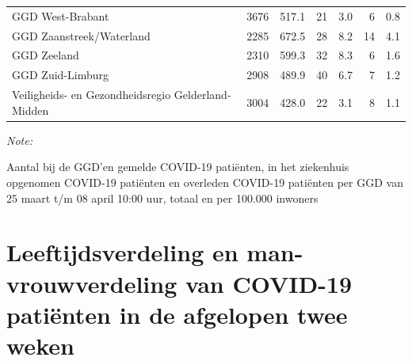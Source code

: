 \documentclass[
  english,
  man,floatsintext]{apa6}
\begin{document}
\begin{table}
\begin{threeparttable}
\begin{tabular}{lrrrrrr}
GGD West-Brabant & 3676 & 517.1 & 21 & 3.0 & 6 & 0.8\\
GGD Zaanstreek/Waterland & 2285 & 672.5 & 28 & 8.2 & 14 & 4.1\\
GGD Zeeland & 2310 & 599.3 & 32 & 8.3 & 6 & 1.6\\
GGD Zuid-Limburg & 2908 & 489.9 & 40 & 6.7 & 7 & 1.2\\
Veiligheids- en Gezondheidsregio Gelderland-Midden & 3004 & 428.0 & 22 & 3.1 & 8 & 1.1\\
\bottomrule
\end{tabular}
\begin{tablenotes}
\item \textit{Note: } 
\item Aantal bij de GGD’en gemelde COVID-19 patiënten, in het ziekenhuis opgenomen COVID-19 patiënten en overleden COVID-19 patiënten per GGD van 25 maart t/m 08 april 10:00 uur, totaal en per 100.000 inwoners
\end{tablenotes}
\end{threeparttable}
\endgroup{}
\end{table}

\newpage

\hypertarget{leeftijdsverdeling-en-man-vrouwverdeling-van-covid-19-patiuxebnten-in-de-afgelopen-twee-weken}{%
\section{Leeftijdsverdeling en man-vrouwverdeling van COVID-19 patiënten in de afgelopen twee weken}\label{leeftijdsverdeling-en-man-vrouwverdeling-van-covid-19-patiuxebnten-in-de-afgelopen-twee-weken}}
\end{document}
